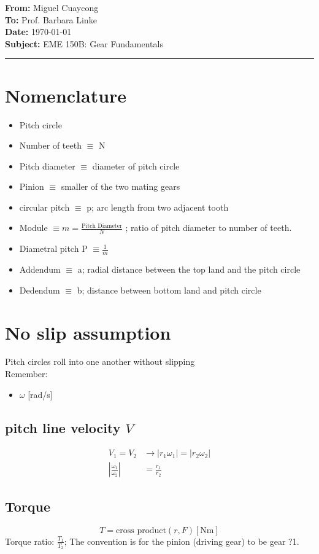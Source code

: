 \documentclass[11pt]{article}
\newcommand{\memoheader}[4]{
  \noindent
  \textbf{From:} #2\\ 
  \textbf{To:} #1\\
  \textbf{Date:} #3\\
  \textbf{Subject:} #4\\[1ex]\hrule\vspace{1.5ex}
}
\begin{document}
\memoheader{Prof. Barbara Linke}
            {Miguel Cuaycong}
            {\today}
            {EME 150B: Gear Fundamentals}

\section{Nomenclature}
\begin{itemize}
    \item Pitch circle 
    \item Number of teeth $\equiv$ N
    \item Pitch diameter $\equiv$ diameter of pitch circle
    \item Pinion $\equiv$ smaller of the two mating gears
    \item circular pitch $\equiv$ p; arc length from two adjacent tooth
    \item Module $\equiv m = \frac{\text{Pitch Diameter}}{N}$ ; ratio of pitch diameter to number of teeth.
    \item Diametral pitch P $\equiv \frac{1}{m}$
    \item Addendum $\equiv$ a; radial distance between the top land and the pitch circle
    \item Dedendum $\equiv$ b; distance between bottom land and pitch circle
\end{itemize}
\section{No slip assumption}
Pitch circles roll into one another without slipping
\\
Remember:
\begin{itemize}
    \item $\omega$ [rad/s]
\end{itemize}
\subsection{pitch line velocity $V$}
\begin{align*}
    V_1 = V_2 &\rightarrow |r_1\omega_1| = |r_2\omega_2|
    \\
    |\frac{\omega_1}{\omega_2}| &= \frac{r_1}{r_2}
\end{align*}
\subsection{Torque}
$$T = \text{cross product}(r, F) [\text{Nm}]$$
Torque ratio: $\frac{T_1}{T_2}$; The convention is for the pinion (driving gear) to be gear ?1.
\end{document}
